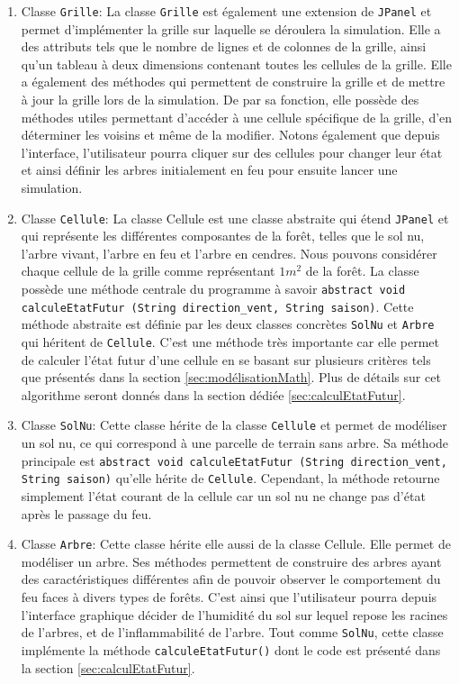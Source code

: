 \begin{enumerate}
    \item Classe \texttt{Grille}: La classe \texttt{Grille} est également une extension de \texttt{JPanel} et permet d'implémenter la grille sur laquelle se déroulera la simulation. Elle a des attributs tels que le nombre de lignes et de colonnes de la grille, ainsi qu'un tableau à deux dimensions contenant toutes les cellules de la grille. Elle a également des méthodes qui permettent de construire la grille et de mettre à jour la grille lors de la simulation. De par sa fonction, elle possède des méthodes utiles permettant d’accéder à une cellule spécifique de la grille, d’en déterminer les voisins et même de la modifier. Notons également que depuis l’interface, l’utilisateur pourra cliquer sur des cellules pour changer leur état et ainsi définir les arbres initialement en feu pour ensuite lancer une simulation.\\
    
    \item Classe \texttt{Cellule}: La classe Cellule est une classe abstraite qui étend \texttt{JPanel} et qui représente les différentes composantes de la forêt, telles que le sol nu, l'arbre vivant, l'arbre en feu et l'arbre en cendres. Nous pouvons considérer chaque cellule de la grille comme représentant $1 m^2$ de la forêt. La classe possède une méthode centrale du programme à savoir \texttt{abstract void calculeEtatFutur (String direction\_vent, String saison)}. Cette méthode abstraite est définie par les deux classes concrètes \texttt{SolNu} et \texttt{Arbre} qui héritent de \texttt{Cellule}. C’est une méthode très importante car elle permet de calculer l’état futur d’une cellule en se basant sur plusieurs critères tels que présentés dans la section \ref{sec:modélisationMath}. Plus de détails sur cet algorithme seront donnés dans la section dédiée \ref{sec:calculEtatFutur}.\\
    
    \item Classe \texttt{SolNu}: Cette classe hérite de la classe \texttt{Cellule} et permet de modéliser un sol nu, ce qui correspond à une parcelle de terrain sans arbre. Sa méthode principale est \texttt{abstract void calculeEtatFutur (String direction\_vent, String saison)} qu’elle hérite de \texttt{Cellule}. Cependant, la méthode retourne simplement l’état courant de la cellule car un sol nu ne change pas d’état après le passage du feu.\\
    
    \item Classe \texttt{Arbre}: Cette classe hérite elle aussi de la classe Cellule. Elle permet de modéliser un arbre. Ses méthodes permettent de construire des arbres ayant des caractéristiques différentes afin de pouvoir observer le comportement du feu faces à divers types de forêts. C’est ainsi que l’utilisateur pourra depuis l’interface graphique décider de l’humidité du sol sur lequel repose les racines de l’arbres, et de l’inflammabilité de l’arbre. Tout comme \texttt{SolNu}, cette classe implémente la méthode \texttt{calculeEtatFutur()} dont le code est présenté dans la section \ref{sec:calculEtatFutur}.\\
\end{enumerate}


